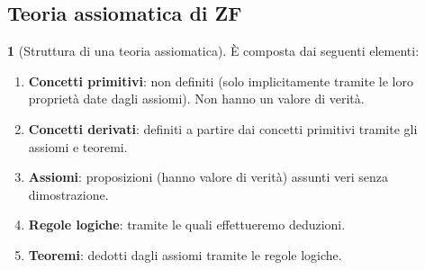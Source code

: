 \documentclass[a4paper,10pt]{article}
\theoremstyle{definition}
\theoremstyle{indentdefinition}
\theoremstyle{indentpostulate}
\theoremstyle{indenttheorem}
\theoremstyle{myremark}
\theoremstyle{indentgeneral}
\newtheorem*{gen}{}
\newenvironment{myboxed} 
{\noindent\begin{lrbox}{\mybox}\begin{minipage}{\textwidth}}
{\end{minipage}\end{lrbox}\fbox{\usebox{\mybox}}}
\begin{document}
\subsection{Teoria assiomatica di ZF}
\begin{myboxed}
    \begin{gen}[Struttura di una teoria assiomatica] È composta dai seguenti elementi:
    \begin{enumerate}
        \item \textbf{Concetti primitivi}: non definiti (solo implicitamente tramite le loro proprietà date dagli assiomi). Non hanno un valore di verità.
        \item \textbf{Concetti derivati}: definiti a partire dai concetti primitivi tramite gli assiomi e teoremi.
        \item \textbf{Assiomi}: proposizioni (hanno valore di verità) assunti veri senza dimostrazione.
        \item \textbf{Regole logiche}: tramite le quali effettueremo deduzioni.
        \item \textbf{Teoremi}: dedotti dagli assiomi tramite le regole logiche.
    \end{enumerate}
    \end{gen}
\end{myboxed}
\end{document}
